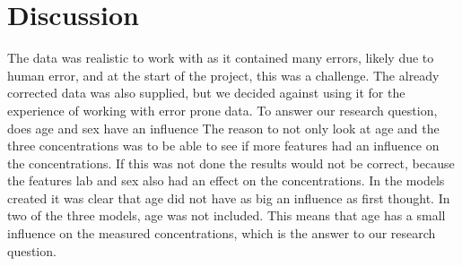 \documentclass{article}
\begin{document}
  \section{Discussion}
    The data was realistic to work with as it contained many errors, likely due to human error, and at the start of the project, this was a challenge.
    The already corrected data was also supplied, but we decided against using it for the experience of working with error prone data.
    To answer our research question, does age and sex have an influence 
    The reason to not only look at age and the three concentrations was to be able to see if more features had an influence on the concentrations.
    If this was not done the results would not be correct, because the features lab and sex also had an effect on the concentrations.
    In the models created it was clear that age did not have as big an influence as first thought.
    In two of the three models, age was not included.
    This means that age has a small influence on the measured concentrations, which is the answer to our research question.
    
\end{document}

